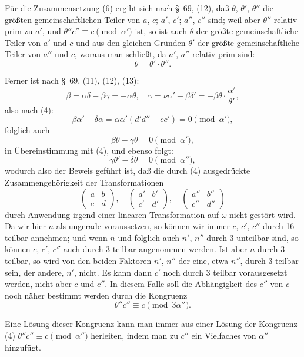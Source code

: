 \documentclass[12pt,a4paper]{article}
\theoremstyle{definition}
\begin{document}
Für die Zusammensetzung (6) ergibt sich nach \S\ 69, (12), daß $\theta$, $\theta'$, $\theta''$ die größten gemeinschaftlichen Teiler von $a$, $c$; $a'$, $c'$; $a''$, $c''$ sind; weil aber $\theta''$ relativ prim zu $a'$, und $\theta'' c'' \equiv c \pmod{\alpha'}$ ist, so ist auch $\theta$ der größte gemeinschaftliche Teiler von $a'$ und $c$ und aus den gleichen Gründen $\theta'$ der größte gemeinschaftliche Teiler von $a''$ und $c$, woraus man schließt, da $a'$, $a''$ relativ prim sind:
\[
\theta = \theta' \cdot \theta''.
\]

Ferner ist nach \S\ 69, (11), (12), (13):
\[
\beta = \alpha\delta - \beta\gamma = -\alpha\theta, \quad \gamma = \nu\alpha' - \beta\delta' = -\beta\theta \cdot \frac{\alpha'}{\theta'},
\]
also nach (4):
\[
\beta\alpha' - \delta\alpha = \alpha\alpha'(d'd'' - cc') = 0 \pmod{\alpha'},
\]
folglich auch
\[
\beta\theta - \gamma\theta = 0 \pmod{\alpha'},
\]
in Übereinstimmung mit (4), und ebenso folgt:
\[
\gamma\theta' - \delta\theta = 0 \pmod{\alpha''},
\]
wodurch also der Beweis geführt ist, daß die durch (4) ausgedrückte Zusammengehörigkeit der Transformationen
\[
\begin{pmatrix} a & b \\ c & d \end{pmatrix}, \quad \begin{pmatrix} a' & b' \\ c' & d' \end{pmatrix}, \quad \begin{pmatrix} a'' & b'' \\ c'' & d'' \end{pmatrix}
\]
durch Anwendung irgend einer linearen Transformation auf $\omega$ nicht gestört wird. Da wir hier $n$ als ungerade voraussetzen, so können wir immer $c$, $c'$, $c''$ durch 16 teilbar annehmen; und wenn $n$ und folglich auch $n'$, $n''$ durch 3 unteilbar sind, so können $c$, $c'$, $c''$ auch durch 3 teilbar angenommen werden. Ist aber $n$ durch 3 teilbar, so wird von den beiden Faktoren $n'$, $n''$ der eine, etwa $n''$, durch 3 teilbar sein, der andere, $n'$, nicht. Es kann dann $c'$ noch durch 3 teilbar vorausgesetzt werden, nicht aber $c$ und $c''$. In diesem Falle soll die Abhängigkeit des $c''$ von $c$ noch näher bestimmt werden durch die Kongruenz
\begin{equation}\label{eq:76-7}
\theta'' c'' \equiv c \pmod{3\alpha''}.
\end{equation}

Eine Lösung dieser Kongruenz kann man immer aus einer Lösung der Kongruenz (4) $\theta'' c'' \equiv c \pmod{\alpha''}$ herleiten, indem man zu $c''$ ein Vielfaches von $\alpha''$ hinzufügt.
\end{document}
